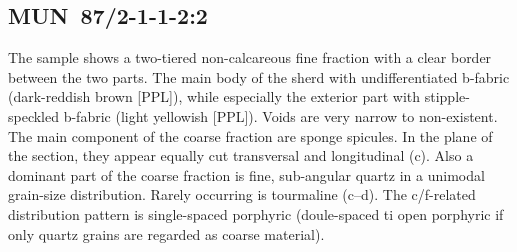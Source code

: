\documentclass[a4paper]{article}
\begin{document}
\subsection{MUN~87/2-1-1-2:2 \citep[mun\#3; Fig.~\ref{fig:mun.pottery}.1; Pikunda-Munda style;][472 Pl.~91.2]{Seidensticker.2021e}}

\begin{multicols}{2}
\noindent The sample shows a two-tiered non-calcareous fine fraction with a clear border between the two parts. The main body of the sherd with undifferentiated b-fabric (dark-reddish brown [PPL]), while especially the exterior part with stipple-speckled b-fabric (light yellowish [PPL]). Voids are very narrow to non-existent. The main component of the coarse fraction are sponge spicules. In the plane of the section, they appear equally cut transversal and longitudinal (c). Also a dominant part of the coarse fraction is fine, sub-angular quartz in a unimodal grain-size distribution. Rarely occurring is tourmaline (c--d). The c/f-related distribution pattern is single-spaced porphyric (doule-spaced ti open porphyric if only quartz grains are regarded as coarse material).
\end{multicols}
\end{document}
